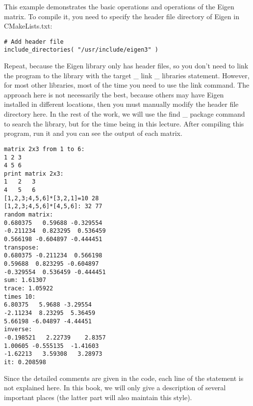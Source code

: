 This example demonstrates the basic operations and operations of the Eigen matrix. To compile it, you need to specify the header file directory of Eigen in CMakeLists.txt:
\begin{lstlisting}[caption=slambook2/ch3/useEigen/CMakeLists.txt]
# Add header file
include_directories( "/usr/include/eigen3" )
\end{lstlisting}

Repeat, because the Eigen library only has header files, so you don't need to link the program to the library with the target \_ link \_ libraries statement. However, for most other libraries, most of the time you need to use the link command. The approach here is not necessarily the best, because others may have Eigen installed in different locations, then you must manually modify the header file directory here. In the rest of the work, we will use the find \_ package command to search the library, but for the time being in this lecture. After compiling this program, run it and you can see the output of each matrix.

\begin{lstlisting}[caption=Terminal input:]
% build/eigenMatrix
matrix 2x3 from 1 to 6: 
1 2 3
4 5 6
print matrix 2x3: 
1	2	3	
4	5	6	
[1,2,3;4,5,6]*[3,2,1]=10 28
[1,2,3;4,5,6]*[4,5,6]: 32 77
random matrix: 
0.680375   0.59688 -0.329554
-0.211234  0.823295  0.536459
0.566198 -0.604897 -0.444451
transpose: 
0.680375 -0.211234  0.566198
0.59688  0.823295 -0.604897
-0.329554  0.536459 -0.444451
sum: 1.61307
trace: 1.05922
times 10: 
6.80375   5.9688 -3.29554
-2.11234  8.23295  5.36459
5.66198 -6.04897 -4.44451
inverse: 
-0.198521   2.22739    2.8357
1.00605 -0.555135  -1.41603
-1.62213   3.59308   3.28973
it: 0.208598
\end{lstlisting}

Since the detailed comments are given in the code, each line of the statement is not explained here. In this book, we will only give a description of several important places (the latter part will also maintain this style).

